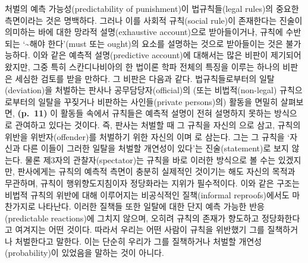 처벌의 예측 가능성(predictability of punishment)이 법규칙들(legal
rules)의 중요한 측면이라는 것은 명백하다. 그러나 이를 사회적 규칙(social
rule)이 존재한다는 진술이 의미하는 바에 대한 망라적 설명(exhaustive
account)으로 받아들이거나, 규칙에 수반되는 ‘\textasciitilde 해야
한다’(must 또는 ought)의 요소를 설명하는 것으로 받아들이는 것은
불가능하다. 이와 같은 예측적 설명(predictive account)에 대해서는 많은
비판이 제기되어 왔지만, 그중 특히 스칸디나비아의 한 법이론 학파 전체의
특징을 이루는 하나의 비판은 세심한 검토를 받을 만하다. 그 비판은 다음과
같다. 법규칙들로부터의 일탈(deviation)을 처벌하는 판사나
공무담당자(official)의 (또는 비법적(non-legal) 규칙으로부터의 일탈을
꾸짖거나 비판하는 사인들(private persons)의) 활동을 면밀히 살펴보면,
\textbf{(p.~11)} 이 활동들 속에서 규칙들은 예측적 설명이 전혀 설명하지
못하는 방식으로 관여하고 있다는 것이다. 즉, 판사는 처벌할 때 그 규칙을
자신의 으로 삼고, 규칙의 위반을
위반자(offender)를 처벌하기 위한 자신의 이며
로 삼는다. 그는 그 규칙을 ‘자신과 다른
이들이 그러한 일탈을 처벌할 개연성이 있다’는 진술(statement)로 보지
않는다. 물론 제3자의 관찰자(spectator)는 규칙을 바로 이러한 방식으로 볼
수는 있겠지만, 판사에게는 규칙의 예측적 측면이 충분히 실제적인 것이기는
해도 자신의 목적과 무관하며, 규칙이 행위향도지침이자 정당화라는 지위가
필수적이다. 이와 같은 구조는 비법적 규칙의 위반에 대해 이루어지는
비공식적인 질책(informal reproofs)에서도 마찬가지로 나타난다. 이러한
질책들 또한 일탈에 대한 단지 예측 가능한 반응(predictable reactions)에
그치지 않으며, 오히려 규칙의 존재가 향도하고 정당화한다고 여겨지는 어떤
것이다. 따라서 우리는 어떤 사람이 규칙을 위반했기 
그를 질책하거나 처벌한다고 말한다. 이는 단순히 우리가 그를 질책하거나
처벌할 개연성(probability)이 있었음을 말하는 것이 아니다.

